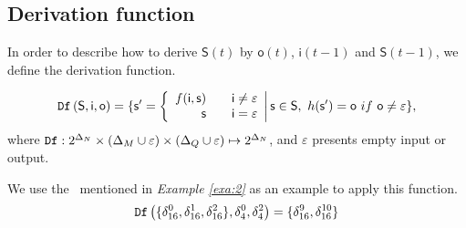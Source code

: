 

\subsection{Derivation function}
In order to describe how to derive $\mathsf{S}(t)$ by $\mathsf{o}(t)$, $\mathsf{i}(t-1)$ and $\mathsf{S}(t-1)$, we define the derivation function. %
\begin{definition}[$\Ded\left( \mathsf{S},  \mathsf{i},  \mathsf{o}\right)$] 
\begin{equation*}
\begin{split}
\Ded\left( \mathsf{S},  \mathsf{i},  \mathsf{o}\right)
=\{ \mathsf{s}'=\left\{
\begin{array}{rcl}
f( \mathsf{i}, \mathsf{s})      &      & {\mathsf{i}\neq \varepsilon}\\
\mathsf{s}       &      & {\mathsf{i}= \varepsilon}
\end{array} \right |\mathsf{s} \in \mathsf{S}, \ h(\mathsf{s}')=\mathsf{o}\ if\ \mathsf{o}\neq \varepsilon\},
\end{split}
\end{equation*}
where ${\tt Df}:2^{\Delta_N}\times (\Delta_M\cup\varepsilon) \times (\Delta_Q\cup\varepsilon) \mapsto 2^{\Delta_N}$, and $\varepsilon$ presents empty input or output.
\end{definition}

\begin{example}
We use the \BCN\ mentioned in {\em Example \ref{exa:2}} as an example to apply this function. \[{\tt Df}\left(\{\delta_{16}^0,\delta_{16}^1,\delta_{16}^2\},\delta_4^0,\delta_4^2\right)=\{\delta_{16}^{9},\delta_{16}^{10}\}\]
 \label{exa:8}
 \end{example}   
 
